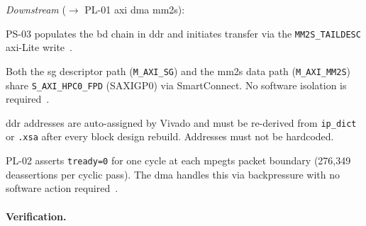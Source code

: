 \textit{Downstream} ($\rightarrow$ PL-01 \ac{axi} \ac{dma} \ac{mm2s}):
\begin{tightemize}
  \item PS-03 populates the \ac{bd} chain in \ac{ddr} and
        initiates transfer via the \texttt{MM2S\_TAILDESC}
        \ac{axi}-Lite write~\cite{AMD_PG021}.
  \item Both the \ac{sg} descriptor path (\texttt{M\_AXI\_SG})
        and the \ac{mm2s} data path (\texttt{M\_AXI\_MM2S})
        share \texttt{S\_AXI\_HPC0\_FPD} (SAXIGP0) via
        SmartConnect. No software isolation is required~\cite{AMD_PG247}.
  \item \ac{ddr} addresses are auto-assigned by Vivado and must
        be re-derived from \texttt{ip\_dict} or \texttt{.xsa}
        after every block design rebuild. Addresses must not
        be hardcoded.
  \item PL-02 asserts \texttt{tready=0} for one cycle at each
        \ac{mpegts} packet boundary (276{,}349 deassertions per
        cyclic pass). The \ac{dma} handles this via
        backpressure with no software action
        required~\cite{AMD_PG021}.
\end{tightemize}


\FloatBarrier
\clearpage
\paragraph{Verification.}
\leavevmode\par

